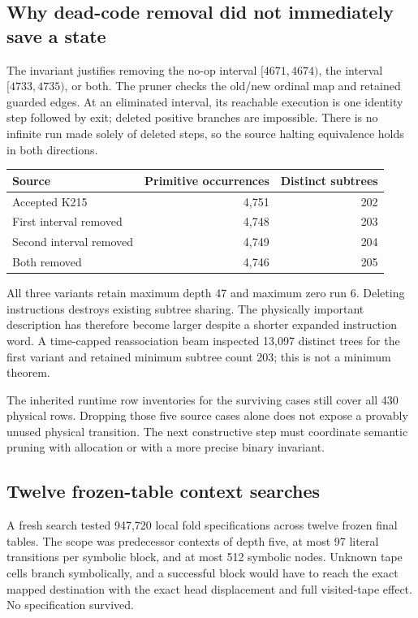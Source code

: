 \documentclass[11pt]{article}
\theoremstyle{remark}\newtheorem{remark}[theorem]{Remark}
\begin{document}
\subsection{Why dead-code removal did not immediately save a state}

The invariant justifies removing the no-op interval $[4671,4674)$, the interval $[4733,4735)$, or both. The pruner checks the old/new ordinal map and retained guarded edges. At an eliminated interval, its reachable execution is one identity step followed by exit; deleted positive branches are impossible. There is no infinite run made solely of deleted steps, so the source halting equivalence holds in both directions.

\begin{center}
\begin{tabular}{lrr}
\toprule
Source & Primitive occurrences & Distinct subtrees \\
\midrule
Accepted K215 & 4,751 & 202 \\
First interval removed & 4,748 & 203 \\
Second interval removed & 4,749 & 204 \\
Both removed & 4,746 & 205 \\
\bottomrule
\end{tabular}
\end{center}
All three variants retain maximum depth 47 and maximum zero run 6. Deleting instructions destroys existing subtree sharing. The physically important description has therefore become larger despite a shorter expanded instruction word. A time-capped reassociation beam inspected 13,097 distinct trees for the first variant and retained minimum subtree count 203; this is not a minimum theorem.

The inherited runtime row inventories for the surviving cases still cover all 430 physical rows. Dropping those five source cases alone does not expose a provably unused physical transition. The next constructive step must coordinate semantic pruning with allocation or with a more precise binary invariant.

\subsection{Twelve frozen-table context searches}

A fresh search tested 947,720 local fold specifications across twelve frozen final tables. The scope was predecessor contexts of depth five, at most 97 literal transitions per symbolic block, and at most 512 symbolic nodes. Unknown tape cells branch symbolically, and a successful block would have to reach the exact mapped destination with the exact head displacement and full visited-tape effect. No specification survived.
\end{document}
